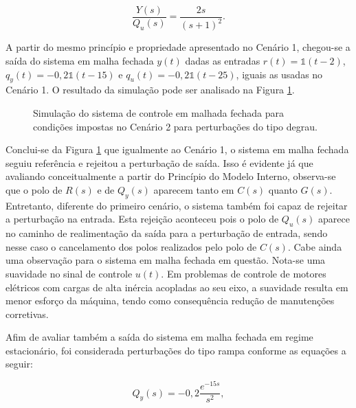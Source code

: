 \begin{equation}
    \label{eq:y2qu-cenario2}
    \frac{Y(s)}{Q_{u}(s)} = \frac{2s}{(s + 1)^2}.
\end{equation}

A partir do mesmo princípio e propriedade apresentado no Cenário 1, chegou-se a
saída do sistema em malha fechada $y(t)$ dadas as entradas
$r(t) = \mathds{1}(t - 2)$, $q_{y}(t) = -0,2\mathds{1}(t - 15)$ e
$q_{u}(t) = -0,2\mathds{1}(t - 25)$, iguais as usadas no Cenário 1. O resultado
da simulação pode ser analisado na Figura \ref{fig:resultado-cenario2-a}.

\begin{figure}[!ht]
    \caption{Simulação do sistema de controle em malhada fechada para condições
    impostas no Cenário 2 para perturbações do tipo degrau.}
    \vspace{-10pt}
    \hspace{-30pt}
    \label{fig:resultado-cenario2-a}
    \begin{minipage}{\linewidth}
        
    \end{minipage}
\end{figure}

Conclui-se da Figura \ref{fig:resultado-cenario2-a} que igualmente ao
Cenário 1, o sistema em malha fechada seguiu referência e rejeitou a perturbação
de saída. Isso é evidente já que avaliando conceitualmente a partir do Princípio
do Modelo Interno, observa-se que o polo de $R(s)$ e de $Q_{y}(s)$ aparecem
tanto em $C(s)$ quanto $G(s)$. Entretanto, diferente do primeiro cenário, o
sistema também foi capaz de rejeitar a perturbação na entrada. Esta rejeição
aconteceu pois o polo de $Q_{u}(s)$ aparece no caminho de realimentação da saída
para a perturbação de entrada, sendo nesse caso o cancelamento dos polos
realizados pelo polo de $C(s)$. Cabe ainda uma observação para o sistema em
malha fechada em questão. Nota-se uma suavidade no sinal de controle $u(t)$. Em
problemas de controle de motores elétricos com cargas de alta inércia acopladas
ao seu eixo, a suavidade resulta em menor esforço da máquina, tendo como
consequência redução de manutenções corretivas.

Afim de avaliar também a saída do sistema em malha fechada em regime
estacionário, foi considerada perturbações do tipo rampa conforme as equações
a seguir:

\begin{equation}
    \label{eq:qys-rampa-cenario2}
    Q_{y}(s) = -0,2\frac{e^{-15s}}{s^2},
\end{equation}

